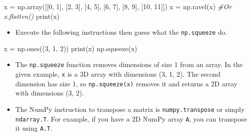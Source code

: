 \documentclass[11pt]{article}
\providecommand{\tightlist}{%
      \setlength{\itemsep}{0pt}\setlength{\parskip}{0pt}}
\newenvironment{Shaded}{}{}
\newcommand{\DecValTok}[1]{\textcolor[rgb]{0.25,0.63,0.44}{{#1}}}
\newcommand{\CommentTok}[1]{\textcolor[rgb]{0.38,0.63,0.69}{\textit{{#1}}}}
\newcommand{\NormalTok}[1]{{#1}}
\newcommand{\OperatorTok}[1]{\textcolor[rgb]{0.40,0.40,0.40}{{#1}}}
\newcommand{\BuiltInTok}[1]{{#1}}
\begin{document}
\begin{Shaded}
\begin{tcolorbox}[breakable, size=fbox, boxrule=1pt, pad at break*=1mm,colback=cellbackground, colframe=cellborder]
  \begin{Highlighting}[]
\NormalTok{x }\OperatorTok{=}\NormalTok{ np.array([[}\DecValTok{0}\NormalTok{, }\DecValTok{1}\NormalTok{], [}\DecValTok{2}\NormalTok{, }\DecValTok{3}\NormalTok{], [}\DecValTok{4}\NormalTok{, }\DecValTok{5}\NormalTok{], [}\DecValTok{6}\NormalTok{, }\DecValTok{7}\NormalTok{], [}\DecValTok{8}\NormalTok{, }\DecValTok{9}\NormalTok{], [}\DecValTok{10}\NormalTok{, }\DecValTok{11}\NormalTok{]])}
\NormalTok{x }\OperatorTok{=}\NormalTok{ np.ravel(x) }\CommentTok{\#Or x.flatten()}
\BuiltInTok{print}\NormalTok{(x)}
\end{Highlighting}
\end{tcolorbox}
\end{Shaded}

  \begin{itemize}
  \tightlist
  \item
    Execute the following instructions then guess what the
    \texttt{np.squeeze} do.
  \end{itemize}

\begin{Shaded}
\begin{tcolorbox}[breakable, size=fbox, boxrule=1pt, pad at break*=1mm,colback=cellbackground, colframe=cellborder]
  \begin{Highlighting}[]
\NormalTok{x }\OperatorTok{=}\NormalTok{ np.ones((}\DecValTok{3}\NormalTok{, }\DecValTok{1}\NormalTok{, }\DecValTok{2}\NormalTok{))}
\BuiltInTok{print}\NormalTok{(x)}
\NormalTok{np.squeeze(x)}
\end{Highlighting}
\end{tcolorbox}
\end{Shaded}

  \begin{itemize}
  \tightlist
  \item
    The \texttt{np.squeeze} function removes dimensions of size 1 from
    an array. In the given example, \texttt{x} is a 3D array with
    dimensions (3, 1, 2). The second dimension has size 1, so
    \texttt{np.squeeze(x)} removes it and returns a 2D array with
    dimensions (3, 2).
  \item
    The NumPy instruction to transpose a matrix is
    \texttt{numpy.transpose} or simply \texttt{ndarray.T}. For example,
    if you have a 2D NumPy array \texttt{A}, you can transpose it using
    \texttt{A.T}.
  \end{itemize}
\end{document}
